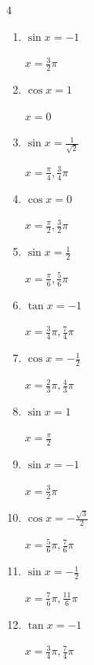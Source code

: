 \begin{multicols}{4}
\begin{enumerate}
  \item $\displaystyle \sin{x}  = -1$

        $\displaystyle x = \frac{3}{2}\pi$

  \item $\displaystyle \cos{x}  = 1$

        $\displaystyle x = 0$

  \item $\displaystyle \sin{x}  = \frac{1}{\sqrt{2}}$

        $\displaystyle x = \frac{\pi}{4} , \frac{3}{4}\pi$

  \item $\displaystyle \cos{x}  = 0$

        $\displaystyle x = \frac{\pi}{2} , \frac{3}{2}\pi$

  \item $\displaystyle \sin{x}  = \frac{1}{2}$

        $\displaystyle x = \frac{\pi}{6} , \frac{5}{6}\pi$

  \item $\displaystyle \tan{x}  = -1$

        $\displaystyle x = \frac{3}{4}\pi , \frac{7}{4}\pi$

  \item $\displaystyle \cos{x}  = -\frac{1}{2}$

        $\displaystyle x = \frac{2}{3}\pi , \frac{4}{3}\pi$

\columnbreak %

  \item $\displaystyle \sin{x}  = 1$

        $\displaystyle x = \frac{\pi}{2}$

  \item $\displaystyle \sin{x}  = -1$

        $\displaystyle x = \frac{3}{2}\pi$

  \item $\displaystyle \cos{x}  = -\frac{\sqrt{3}}{2}$

        $\displaystyle x = \frac{5}{6}\pi , \frac{7}{6}\pi$

  \item $\displaystyle \sin{x}  = -\frac{1}{2}$

        $\displaystyle x = \frac{7}{6}\pi , \frac{11}{6}\pi$

  \item $\displaystyle \tan{x}  = -1$

        $\displaystyle x = \frac{3}{4}\pi , \frac{7}{4}\pi$


\end{enumerate}
\end{multicols}
